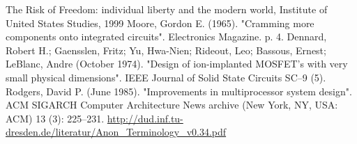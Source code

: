\documentclass{article}
\begin{document}
\begin{thebibliography}{9}
 The Risk of Freedom: individual liberty and the modern world, Institute of United States
Studies, 1999 
 Moore, Gordon E. (1965). "Cramming more components onto integrated circuits". Electronics Magazine. p. 4.
 Dennard, Robert H.; Gaensslen, Fritz; Yu, Hwa-Nien; Rideout, Leo; Bassous, Ernest; LeBlanc, Andre (October 1974). "Design of ion-implanted MOSFET's with very small physical dimensions". IEEE Journal of Solid State Circuits SC–9 (5).
 Rodgers, David P. (June 1985). "Improvements in multiprocessor system design". ACM SIGARCH Computer Architecture News archive (New York, NY, USA: ACM) 13 (3): 225–231.
 \url{http://dud.inf.tu-dresden.de/literatur/Anon_Terminology_v0.34.pdf}
\end{thebibliography}
\end{document}
